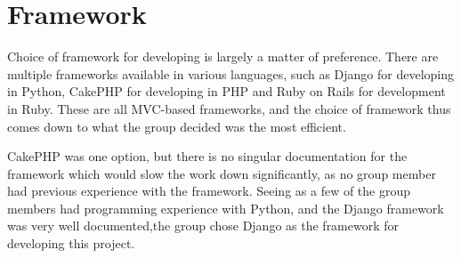 \section{Framework}

Choice of framework for developing is largely a matter of preference. There 
are multiple frameworks available in various languages, such as 
Django\cite{djangoproject11}  for developing in Python, CakePHP\cite{cake11} 
for developing in PHP and Ruby on Rails\cite{ruby11} for development in Ruby. 
These are all MVC-based frameworks, and the choice of framework thus comes 
down to what the group decided was the most efficient.

CakePHP was one option, but there is no singular documentation for the 
framework\cite{hartjes09} which would slow the work down significantly, as no group member 
had previous experience with the framework. Seeing as a few of the group 
members had programming experience with Python, and the Django framework 
was very well documented,the group chose Django as the framework for 
developing this project.

